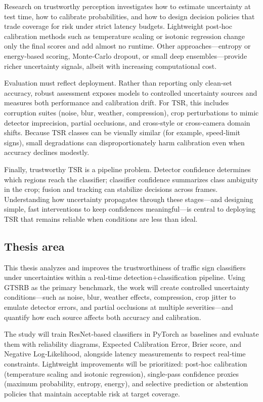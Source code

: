 \documentclass[11pt,a4paper]{article}
\begin{document}
Research on trustworthy perception investigates how to estimate uncertainty at test time, how to calibrate probabilities, and how to design decision policies that trade coverage for risk under strict latency budgets. Lightweight post‑hoc calibration methods such as temperature scaling or isotonic regression change only the final scores and add almost no runtime. Other approaches—entropy or energy‑based scoring, Monte‑Carlo dropout, or small deep ensembles—provide richer uncertainty signals, albeit with increasing computational cost.

Evaluation must reflect deployment. Rather than reporting only clean‑set accuracy, robust assessment exposes models to controlled uncertainty sources and measures both performance and calibration drift. For TSR, this includes corruption suites (noise, blur, weather, compression), crop perturbations to mimic detector imprecision, partial occlusions, and cross‑style or cross‑camera domain shifts. Because TSR classes can be visually similar (for example, speed‑limit signs), small degradations can disproportionately harm calibration even when accuracy declines modestly.

Finally, trustworthy TSR is a pipeline problem. Detector confidence determines which regions reach the classifier; classifier confidence summarizes class ambiguity in the crop; fusion and tracking can stabilize decisions across frames. Understanding how uncertainty propagates through these stages—and designing simple, fast interventions to keep confidences meaningful—is central to deploying TSR that remains reliable when conditions are less than ideal.

\subsection{Thesis area}

This thesis analyzes and improves the trustworthiness of traffic sign classifiers under uncertainties within a real‑time detection+classification pipeline. Using GTSRB as the primary benchmark, the work will create controlled uncertainty conditions—such as noise, blur, weather effects, compression, crop jitter to emulate detector errors, and partial occlusions at multiple severities—and quantify how each source affects both accuracy and calibration.

The study will train ResNet‑based classifiers in PyTorch as baselines and evaluate them with reliability diagrams, Expected Calibration Error, Brier score, and Negative Log‑Likelihood, alongside latency measurements to respect real‑time constraints. Lightweight improvements will be prioritized: post‑hoc calibration (temperature scaling and isotonic regression), single‑pass confidence proxies (maximum probability, entropy, energy), and selective prediction or abstention policies that maintain acceptable risk at target coverage.
\end{document}
